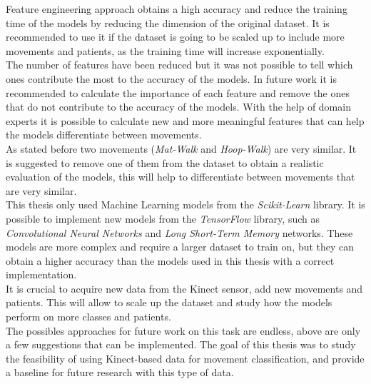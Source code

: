         Feature engineering approach obtains a high accuracy and reduce the training time of the models by reducing the dimension of the original dataset. It is recommended to use it if the dataset is going to be scaled up to include more movements and patients, as the training time will increase exponentially.\\
        The number of features have been reduced but it was not possible to tell which ones contribute the most to the accuracy of the models. In future work it is recommended to calculate the importance of each feature and remove the ones that do not contribute to the accuracy of the models. With the help of domain experts it is possible to calculate new and more meaningful features that can help the models differentiate between movements. \\
        As stated before two movements (\textit{Mat-Walk} and \textit{Hoop-Walk}) are very similar. It is suggested to remove one of them from the dataset to obtain a realistic evaluation of the models, this will help to differentiate between movements that are very similar.\\
        
        This thesis only used Machine Learning models from the \textit{Scikit-Learn} library. It is possible to implement new models from the \textit{TensorFlow} library, such as \textit{Convolutional Neural Networks} and \textit{Long Short-Term Memory} networks. These models are more complex and require a larger dataset to train on, but they can obtain a higher accuracy than the models used in this thesis with a correct implementation. \\
        It is crucial to acquire new data from the Kinect sensor, add new movements and patients. This will allow to scale up the dataset and study how the models perform on more classes and patients. \\

        The possibles approaches for future work on this task are endless, above are only a few suggestions that can be implemented. The goal of this thesis was to study the feasibility of using Kinect-based data for movement classification, and provide a baseline for future research with this type of data. \\
    
    \cleardoublepage